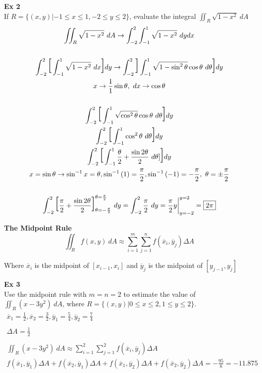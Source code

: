 \documentclass{article}
\begin{document}
 \textbf{Ex 2}\\
 If $ R = \{ (x,y)|-1\le x\le1, -2 \le y \le 2 \} $, evaluate the integral $ \iint_{R}\sqrt{1-x^{2}} ~dA $ 
 \[
   \begin{gathered}
   \iint_R \sqrt{1-x^{2}} ~dA \to \int^{2}_{-2} \int^{1}_{-1}\sqrt{1-x^{2}} ~dydx\\
   ~\\
   \int^{2}_{-2} \text{\huge{[}} \int^{1}_{-1} \sqrt{1-x^{2}} ~dx \text{\huge{]}}dy \to \int^{2}_{-2} \text{\huge{]}} \int^{1}_{-1} \sqrt{1-\sin^{2}{\theta}} \cos{\theta}~d\theta \text{\huge{]}}dy\\
   x \to \frac{1}{1}\sin{\theta},~dx \to \cos{\theta}\\
   ~\\
   \int^{2}_{-2} \text{\huge{[}} \int^{1}_{-1} \sqrt{\cos^{2}{\theta}} \cos{\theta}~d\theta \text{\huge{]}}dy\\
   \int^{2}_{-2} \text{\huge{[}} \int^{1}_{-1} \cos^{2}{\theta}~d\theta \text{\huge{]}}dy\\
   \int^{2}_{-2} \text{\huge{[}} \int^{1}_{-1} \frac{\theta}{2}+\frac{\sin{2\theta}}{2} ~d\theta] \text{\huge{]}}dy\\
   x=\sin{\theta} \to \sin^{-1}{x} = \theta, \sin^{-1}{(1)} = \frac{\pi}{2}, \sin^{-1}{(-1)}=-\frac{\pi}{2}, ~ \theta = \pm \frac{\pi}{2}\\
   ~\\
   \int^{2}_{-2} \text{\huge{[}} \frac{\pi}{2} + \frac{\sin{2\theta}}{2} \text{\huge{]}}^{\theta=\frac{\pi}{2}}_{\theta=-\frac{\pi}{2}} ~dy = \int^{2}_{-2} \frac{\pi}{2}~dy = \frac{\pi}{2}y \bigg|^{y=2}_{y=-2}= \boxed{2\pi}
   \end{gathered}
 \]

 \textbf{The Midpoint Rule}
 \[
   \iint_R f(x,y)~dA \approx \sum^{m}_{i=1} \sum^{n}_{j=1} f(\overline{x}_i,\overline{y}_j) \Delta A 
 \]

 Where $ \overline{x}_i $ is the midpoint of $ [x_{i-1}, x_{i}] $ and $ \overline{y}_j $ is the midpoint of $ [y_{j-1}, y_j] $

 \textbf{Ex 3}\\
 Use the midpoint rule with $ m=n=2 $ to estimate the value of $ \iint_R (x-3y^{2})~dA $, where $ R= \{ (x,y) | 0 \le x \le 2, 1 \le y \le 2 \} $.
 \[
   \begin{gathered}
     \overline{x}_1 = \frac{1}{2}, \overline{x}_2 = \frac{3}{2}, \overline{y}_1 = \frac{5}{4}, \overline{y}_2 = \frac{7}{4}\\
     ~\\
     \Delta A = \frac{1}{2}\\
     ~\\
     \iint_R (x-3y^{2})~dA \approx \sum^{2}_{i=1} \sum^{2}_{j=1} f(\overline{x}_i, \overline{y}_j) \Delta A\\
     f(\overline{x}_1, \overline{y}_1) \Delta A + f(\overline{x}_2, \overline{y}_1) \Delta A + f(\overline{x}_1, \overline{y}_2) \Delta A + f(\overline{x}_2, \overline{y}_2) \Delta A = -\frac{95}{8} = \boxed{-11.875}
   \end{gathered}
 \]
\end{document}
